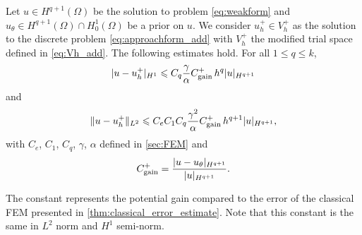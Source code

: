 \begin{theorem}\label{lem:error_estimation_add}
    Let $u\in H^{q+1}(\Omega)$ be the solution to problem \eqref{eq:weakform} and $u_{\theta}\in H^{q+1}(\Omega)\cap H_0^1(\Omega)$ be a prior on $u$.
    We consider $u_h^+\in V_h^+$ as the solution to the discrete problem \eqref{eq:approachform_add} with $V_h^+$ the modified trial space defined in \eqref{eq:Vh_add}.
    The following estimates hold.
    For all $1\leqslant q\leqslant k$,
    \begin{equation}
        \label{eq:error_add}
        | u-u_h^+|_{H^1} \leqslant C_q\dfrac{\gamma}{\alpha} C_\text{\rm gain}^+ \, h^{q} |u|_{H^{q+1}}
    \end{equation}
    and
    \begin{equation*}
        \label{eq:error_addL2}
        \| u-u_h^+\|_{L^2} \leqslant C_e C_1 C_q\dfrac{\gamma^2}{\alpha} C_\text{\rm gain}^+ \, h^{q+1} |u|_{H^{q+1}},
    \end{equation*}
    with $C_e$, $C_1$, $C_q$, $\gamma$, $\alpha$ defined in \cref{sec:FEM} and
    \begin{equation}
        \label{eq:gain_add}
        C_\text{\rm gain}^+= \frac{| u-u_{\theta} |_{H^{q+1}}}{| u |_{H^{q+1}}}.
    \end{equation}
\end{theorem}
\begin{remark}\label{rmk:gain_add}
    The constant 
    represents the potential gain compared to the error of the classical FEM presented in \cref{thm:classical_error_estimate}. Note that this constant is the same in $L^2$ norm and $H^1$ semi-norm.
\end{remark}



